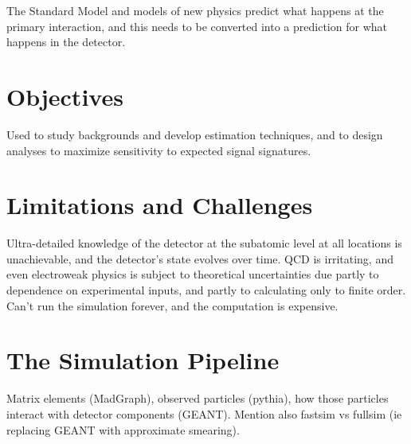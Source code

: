   The Standard Model and models of new physics predict what happens at the primary interaction, and this needs to be converted into a prediction for what happens in the detector.

  \section{Objectives} \label{sec:objectives}

  Used to study backgrounds and develop estimation techniques, and to design analyses to maximize sensitivity to expected signal signatures.

  \section{Limitations and Challenges} \label{sec:limitations}

  Ultra-detailed knowledge of the detector at the subatomic level at all locations is unachievable, and the detector's state evolves over time.
  QCD is irritating, and even electroweak physics is subject to theoretical uncertainties due partly to dependence on experimental inputs, and partly to calculating only to finite order.
  Can't run the simulation forever, and the computation is expensive.

  \section{The Simulation Pipeline} \label{sec:pipeline}

  Matrix elements (MadGraph), observed particles (pythia), how those particles interact with detector components (GEANT).
  Mention also fastsim vs fullsim (ie replacing GEANT with approximate smearing).
